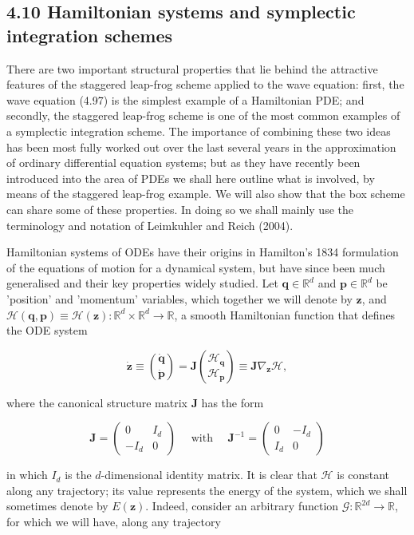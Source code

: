 \documentclass[10pt]{article}
\begin{document}
\subsection*{4.10 Hamiltonian systems and symplectic integration schemes}
There are two important structural properties that lie behind the attractive features of the staggered leap-frog scheme applied to the wave equation: first, the wave equation (4.97) is the simplest example of a Hamiltonian PDE; and secondly, the staggered leap-frog scheme is one of the most common examples of a symplectic integration scheme. The importance of combining these two ideas has been most fully worked out over the last several years in the approximation of ordinary differential equation systems; but as they have recently been introduced into the area of PDEs we shall here outline what is involved, by means of the staggered leap-frog example. We will also show that the box scheme can share some of these properties. In doing so we shall mainly use the terminology and notation of Leimkuhler and Reich (2004).

Hamiltonian systems of ODEs have their origins in Hamilton's 1834 formulation of the equations of motion for a dynamical system, but have since been much generalised and their key properties widely studied. Let \(\mathbf{q} \in \mathbb{R}^{d}\) and \(\mathbf{p} \in \mathbb{R}^{d}\) be 'position' and 'momentum' variables, which together we will denote by \(\mathbf{z}\), and \(\mathcal{H}(\mathbf{q}, \mathbf{p}) \equiv \mathcal{H}(\mathbf{z}): \mathbb{R}^{d} \times \mathbb{R}^{d} \rightarrow \mathbb{R}\), a smooth Hamiltonian function that defines the ODE system

\[
\dot{\mathbf{z}} \equiv\binom{\dot{\mathbf{q}}}{\dot{\mathbf{p}}}=\mathbf{J}\binom{\mathcal{H}_{\mathbf{q}}}{\mathcal{H}_{\mathbf{p}}} \equiv \mathbf{J} \nabla_{\mathbf{z}} \mathcal{H},
\]

where the canonical structure matrix \(\mathbf{J}\) has the form

\[
\mathbf{J}=\left(\begin{array}{cc}
0 & I_{d} \\
-I_{d} & 0
\end{array}\right) \quad \text { with } \quad \mathbf{J}^{-1}=\left(\begin{array}{cc}
0 & -I_{d} \\
I_{d} & 0
\end{array}\right)
\]

in which \(I_{d}\) is the \(d\)-dimensional identity matrix. It is clear that \(\mathcal{H}\) is constant along any trajectory; its value represents the energy of the system, which we shall sometimes denote by \(E(\mathbf{z})\). Indeed, consider an arbitrary function \(\mathcal{G}: \mathbb{R}^{2 d} \rightarrow \mathbb{R}\), for which we will have, along any trajectory
\end{document}
